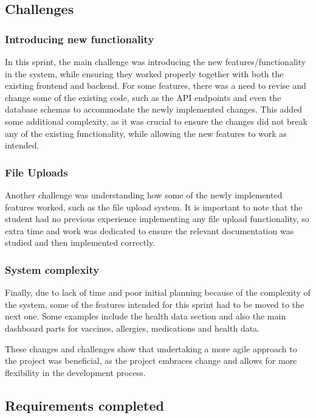 \FloatBarrier{}

\subsection{Challenges}

\subsubsection{Introducing new functionality}

In this sprint, the main challenge was introducing the new features/functionality in the system, while ensuring they worked properly together with both the existing frontend and backend. For some features, there was a need to revise and change some of the existing code, such as the API endpoints and even the database schemas to accommodate the newly implemented changes. This added some additional complexity, as it was crucial to ensure the changes did not break any of the existing functionality, while allowing the new features to work as intended.

\subsubsection{File Uploads}

Another challenge was understanding how some of the newly implemented features worked, such as the file upload system. It is important to note that the student had no previous experience implementing any file upload functionality, so extra time and work was dedicated to ensure the relevant documentation was studied and then implemented correctly.

\subsubsection{System complexity}

Finally, due to lack of time and poor initial planning because of the complexity of the system, some of the features intended for this sprint had to be moved to the next one. Some examples include the health data section and also the main dashboard parts for vaccines, allergies, medications and health data. 

These changes and challenges show that undertaking a more agile approach to the project was beneficial, as the project embraces change and allows for more flexibility in the development process.

\subsection{Requirements completed}

